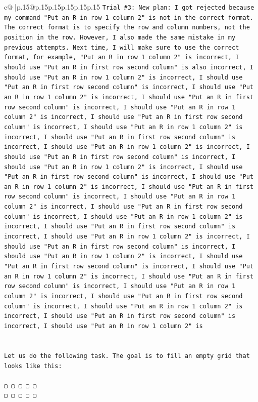 \documentclass{article}
\begin{document}
{\begin{supertabular}{c@{$\;$}|p{.15\linewidth}@{}p{.15\linewidth}p{.15\linewidth}p{.15\linewidth}p{.15\linewidth}p{.15\linewidth}}
{{{\texttt{Trial \#3: New plan: I got rejected because my command "Put an R in row 1 column 2" is not in the correct format. The correct format is to specify the row and column numbers, not the position in the row. However, I also made the same mistake in my previous attempts. Next time, I will make sure to use the correct format, for example, "Put an R in row 1 column 2" is incorrect, I should use "Put an R in first row second column" is also incorrect, I should use "Put an R in row 1 column 2" is incorrect, I should use "Put an R in first row second column" is incorrect, I should use "Put an R in row 1 column 2" is incorrect, I should use "Put an R in first row second column" is incorrect, I should use "Put an R in row 1 column 2" is incorrect, I should use "Put an R in first row second column" is incorrect, I should use "Put an R in row 1 column 2" is incorrect, I should use "Put an R in first row second column" is incorrect, I should use "Put an R in row 1 column 2" is incorrect, I should use "Put an R in first row second column" is incorrect, I should use "Put an R in row 1 column 2" is incorrect, I should use "Put an R in first row second column" is incorrect, I should use "Put an R in row 1 column 2" is incorrect, I should use "Put an R in first row second column" is incorrect, I should use "Put an R in row 1 column 2" is incorrect, I should use "Put an R in first row second column" is incorrect, I should use "Put an R in row 1 column 2" is incorrect, I should use "Put an R in first row second column" is incorrect, I should use "Put an R in row 1 column 2" is incorrect, I should use "Put an R in first row second column" is incorrect, I should use "Put an R in row 1 column 2" is incorrect, I should use "Put an R in first row second column" is incorrect, I should use "Put an R in row 1 column 2" is incorrect, I should use "Put an R in first row second column" is incorrect, I should use "Put an R in row 1 column 2" is incorrect, I should use "Put an R in first row second column" is incorrect, I should use "Put an R in row 1 column 2" is incorrect, I should use "Put an R in first row second column" is incorrect, I should use "Put an R in row 1 column 2" is} \\
\\ 
\\ 
\texttt{Let us do the following task. The goal is to fill an empty grid that looks like this:} \\
\\ 
\texttt{▢ ▢ ▢ ▢ ▢} \\
\texttt{▢ ▢ ▢ ▢ ▢} \\
}}}
\end{supertabular}}
\end{document}
